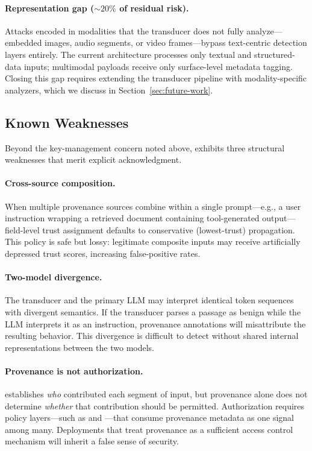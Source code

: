 \paragraph{Representation gap (${\sim}20\%$ of residual risk).}
Attacks encoded in modalities that the \pasr{} transducer does not
fully analyze---embedded images, audio segments, or video
frames---bypass text-centric detection layers entirely.  The current
architecture processes only textual and structured-data inputs;
multimodal payloads receive only surface-level metadata tagging.
Closing this gap requires extending the transducer pipeline with
modality-specific analyzers, which we discuss in
Section~\ref{sec:future-work}.

\subsection{\pasr{} Known Weaknesses}

Beyond the key-management concern noted above, \pasr{} exhibits three
structural weaknesses that merit explicit acknowledgment.

\paragraph{Cross-source composition.}
When multiple provenance sources combine within a single prompt---e.g.,
a user instruction wrapping a retrieved document containing
tool-generated output---field-level trust assignment defaults to
conservative (lowest-trust) propagation.  This policy is safe but
lossy: legitimate composite inputs may receive artificially depressed
trust scores, increasing false-positive rates.

\paragraph{Two-model divergence.}
The \pasr{} transducer and the primary LLM may interpret identical
token sequences with divergent semantics.  If the transducer parses a
passage as benign while the LLM interprets it as an instruction,
provenance annotations will misattribute the resulting behavior.  This
divergence is difficult to detect without shared internal
representations between the two models.

\paragraph{Provenance is not authorization.}
\pasr{} establishes \emph{who} contributed each segment of input, but
provenance alone does not determine \emph{whether} that contribution
should be permitted.  Authorization requires policy layers---such as
\aas{} and \irm{}---that consume provenance metadata as one signal
among many.  Deployments that treat provenance as a sufficient access
control mechanism will inherit a false sense of security.

